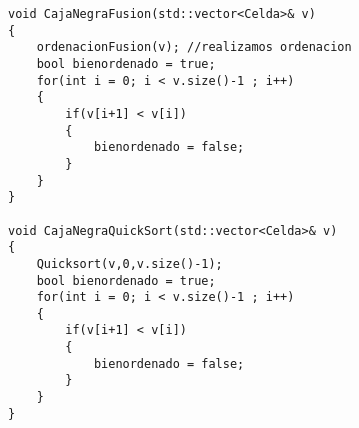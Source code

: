 \begin{lstlisting}[frame=single,basicstyle=\tiny,title={Algoritmo Caja Negra}]
void CajaNegraFusion(std::vector<Celda>& v)
{
	ordenacionFusion(v); //realizamos ordenacion
	bool bienordenado = true;
	for(int i = 0; i < v.size()-1 ; i++)
	{
		if(v[i+1] < v[i])
		{
			bienordenado = false;
		}
	}
}

void CajaNegraQuickSort(std::vector<Celda>& v)
{
	Quicksort(v,0,v.size()-1);
	bool bienordenado = true;
	for(int i = 0; i < v.size()-1 ; i++)
	{
		if(v[i+1] < v[i])
		{
			bienordenado = false;
		}
	}
}
\end{lstlisting}
